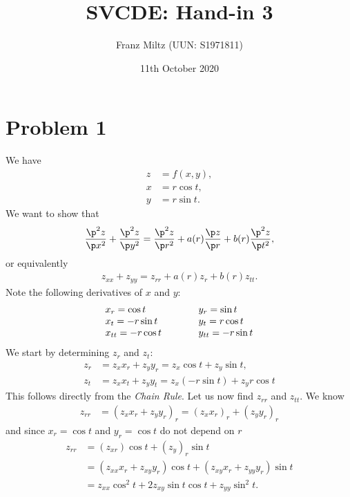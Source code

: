 \documentclass{article}
\begin{document}
\title{SVCDE: Hand-in 3}
\author{Franz Miltz (UUN: S1971811)}
\date{11th October 2020}
\maketitle


\section*{Problem 1}


We have
\begin{align*}
	z & = f(x,y),  \\
	x & = r\cos t, \\
	y & = r\sin t.
\end{align*}
We want to show that
\begin{align*}
	\frac{\p^2 z}{\p x^2}+\frac{\p^2 z}{\p y^2}
	= \frac{\p^2 z}{\p r^2}+a(r)\frac{\p z}{\p r}+b(r)\frac{\p^2 z}{\p t^2},
\end{align*}
or equivalently
\begin{align}
	\label{eq1}
	z_{xx} + z_{yy} = z_{rr} + a(r)z_r + b(r)z_{tt}.
\end{align}
Note the following derivatives of $x$ and $y$:
\begin{align*}
	\begin{array}{l l}
		x_r = \cos t      & \hspace{1cm} y_r = \sin t      \\
		x_t = -r\sin t    & \hspace{1cm} y_t = r\cos t     \\
		x_{tt} = -r\cos t & \hspace{1cm} y_{tt} = -r\sin t
	\end{array}
\end{align*}
We start by determining $z_r$ and $z_t$:
\begin{align*}
	z_r & = z_x x_r + z_y y_r = z_x \cos t + z_y \sin t,     \\
	z_t & = z_x x_t + z_y y_t = z_x (-r\sin t) + z_y r\cos t
\end{align*}
This follows directly from the \emph{Chain Rule}.
Let us now find $z_{rr}$ and $z_{tt}$. We know
\begin{align*}
	z_{rr} & = (z_x x_r + z_y y_r)_r = (z_x x_r)_r + (z_y y_r)_r
\end{align*}
and since $x_r = \cos t$ and $y_r = \cos t$ do not depend on $r$
\begin{align*}
	z_{rr} & = (z_{xr})\cos t + (z_y)_r \sin t                              \\
	       & =(z_{xx}x_r + z_{xy}y_r)\cos t + (z_{xy}x_r + z_{yy}y_r)\sin t \\
	       & =z_{xx}\cos^2 t + 2 z_{xy}\sin t\cos t + z_{yy}\sin^2 t.
\end{align*}
\end{document}

